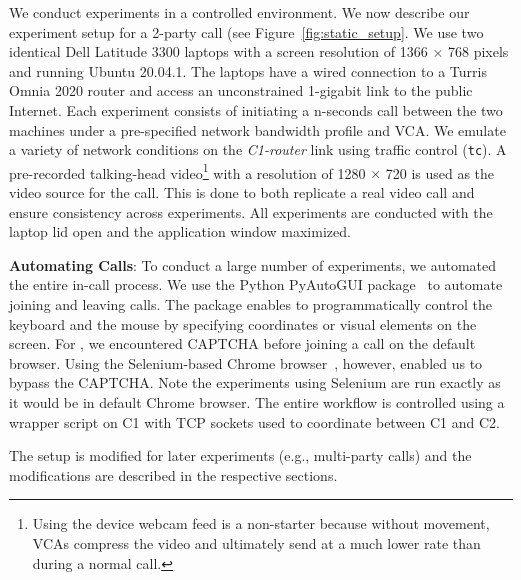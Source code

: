 We conduct experiments in a controlled environment. We now describe our experiment setup for a 2-party call (see Figure~\ref{fig:static_setup}. We use two identical
Dell Latitude 3300 laptops with a screen resolution of 1366 $\times$ 768 pixels and running Ubuntu 20.04.1. The laptops have a wired connection to a Turris Omnia 2020
router and access an unconstrained 1-gigabit link to the public Internet. Each experiment consists of initiating a n-seconds call between the two machines under a
pre-specified network bandwidth profile and VCA. We emulate a variety of network conditions on the \textit{C1-router} link using traffic control (\texttt{tc}). A
pre-recorded talking-head video\footnote{Using the device webcam feed is a non-starter because without movement, VCAs compress the video and ultimately send at a much
lower rate than during a normal call.} with a resolution of 1280 $\times$ 720 is used as the video source for the call. This is done to both replicate a real video call
and ensure consistency across experiments. All experiments are conducted with the laptop lid open and the application window maximized. %



\textbf{Automating Calls}: To conduct a large number of experiments, we automated the entire in-call process. %
We use the Python PyAutoGUI package~\cite{pyautogui} to automate joining and leaving calls. The package enables to programmatically control the keyboard and the mouse by specifying coordinates or visual elements on the screen. For \zoombrowser, we encountered CAPTCHA before joining a call on the default browser. Using the Selenium-based Chrome browser~\cite{selenium}, however, enabled us to bypass the CAPTCHA. Note the experiments using Selenium are run exactly as it would be in default Chrome browser. The entire workflow is controlled using a wrapper script on C1 with TCP sockets used to coordinate between C1 and C2. 




The setup is modified for later experiments (e.g., multi-party calls) and the modifications are described in the respective sections.


